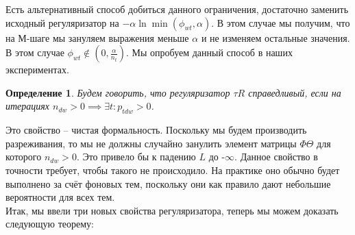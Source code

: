 \documentclass[12pt]{article}
\newtheorem{definition}{Определение}[section]
\begin{document}
Есть альтернативный способ добиться данного ограничения, достаточно заменить исходный регуляризатор на $-\alpha \ln \min(\phi_{wt}, \alpha)$. В этом случае мы получим, что на М-шаге мы зануляем выражения меньше $\alpha$ и не изменяем остальные значения. В этом случае $\phi_{wt}\notin (0, \frac{\alpha}{n_t})$. Мы опробуем данный способ в наших экспериментах.
\begin{definition}
Будем говорить, что регуляризатор $\tau R$ справедливый, если на итерациях $n_{dw} > 0 \implies \exists t\colon p_{tdw} > 0$.
\end{definition}
Это свойство -- чистая формальность. Поскольку мы будем производить разреживания, то мы не должны случайно занулить элемент матрицы $\Phi \Theta$ для которого $n_{dw} > 0$. Это привело бы к падению $L$ до -$\infty$.  Данное свойство в точности требует, чтобы такого не происходило. На практике оно обычно будет выполнено за счёт фоновых тем\cite{artmdef2}, поскольку они как правило дают небольшие вероятности для всех тем.\\
Итак, мы ввели три новых свойства регуляризатора, теперь мы можем доказать следующую теорему:
\end{document}
